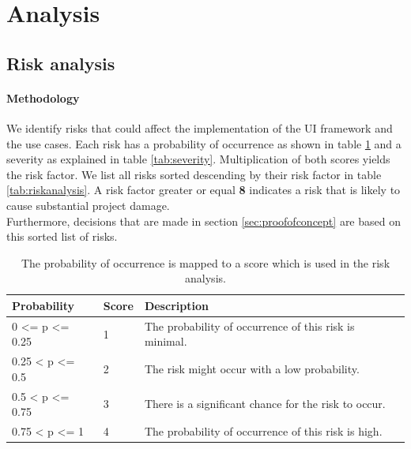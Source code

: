 \section{Analysis}
\subsection{Risk analysis}

\paragraph{Methodology}
We identify risks that could affect the implementation of the UI framework and the use cases. Each risk has a probability of occurrence as shown in table \ref{tab:probability} and a severity as explained in table \ref{tab:severity}. Multiplication of both scores yields the risk factor. We list all risks sorted descending by their risk factor in table \ref{tab:riskanalysis}. A risk factor greater or equal \textbf{8} indicates a risk that is likely to cause substantial project damage. \\
Furthermore, decisions that are made in section \ref{sec:proofofconcept} are based on this sorted list of risks.

\begin{table}[!htb]
  \begin{center}
    \begin{tabular}{|l|l|l|}
      \hline
      \textbf{Probability} & \textbf{Score} & \textbf{Description} \\
      \hline
      0 <= p <= 0.25 & 1 & The probability of occurrence of this risk is minimal. \\
      \hline
      0.25 < p <= 0.5 & 2 & The risk might occur with a low probability. \\
      \hline
      0.5 < p <= 0.75 & 3 & There is a significant chance for the risk to occur. \\
      \hline
      0.75 < p <= 1 & 4 & The probability of occurrence of this risk is high. \\
      \hline
    \end{tabular}
    \caption{The probability of occurrence is mapped to a score which is used in the risk analysis.}
    \label{tab:probability}
  \end{center}
\end{table}

